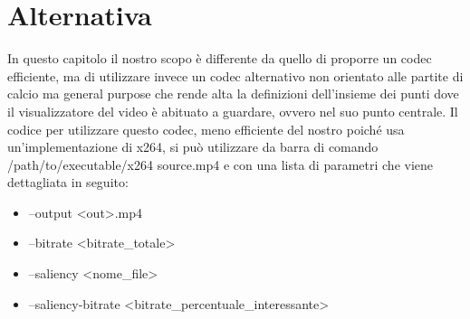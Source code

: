 \chapter{Alternativa}
\label{chap:alternative}
In questo capitolo il nostro scopo è differente da quello di proporre un codec efficiente, ma di utilizzare invece un codec alternativo non orientato alle partite di calcio ma general purpose che rende alta la definizioni dell'insieme dei punti dove il visualizzatore del video è abituato a guardare, ovvero nel suo punto centrale.
Il codice per utilizzare questo codec, meno efficiente del nostro poiché usa un'implementazione di x264, si può utilizzare da barra di comando  
/path/to/executable/x264 source.mp4
e con una lista di parametri che viene dettagliata in seguito:
\begin{itemize}
\item --output <out>.mp4
\item --bitrate <bitrate\_totale> 
\item--saliency <nome\_file>  
\item --saliency-bitrate <bitrate\_percentuale\_interessante>
\end{itemize}